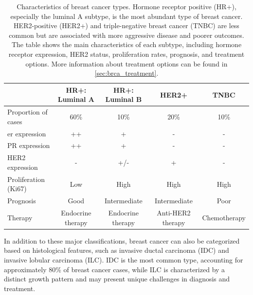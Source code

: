 \begin{table}[ht]
    \begin{tabular}{lcccc}
        \hline
                                        & HR+: Luminal A    & HR+: Luminal B
                                        &
        HER2+
                                        & TNBC
        \\ \hline
        Proportion of cases             & 60\%              & 10\%              &
        20\%
                                        & 10\%
        \\
        \gls{er}\textalpha{} expression & ++                & +
                                        & -
                                        & -
        \\
        PR expression                   & ++                & +                 & -
                                        & -
        \\
        HER2 expression                 & -                 & +/-               & +
                                        & -
        \\
        Proliferation (Ki67)            & Low               & High              &
        High
                                        & High
        \\
        Prognosis                       & Good              & Intermediate      &
        Intermediate
                                        & Poor
        \\
        Therapy                         & Endocrine therapy & Endocrine therapy &
        Anti-HER2
        therapy                         & Chemotherapy
        \\ \hline
    \end{tabular}
    \caption{Characteristics of breast cancer
        types\supercite{clusan_basic_2023}.
        Hormone receptor positive (HR+), especially the luminal A subtype, is the most
        abundant type of breast cancer.
        HER2-positive (HER2+) and triple-negative breast cancer (TNBC) are less common
        but are associated with more aggressive disease and poorer outcomes.
        The table shows the main characteristics of each subtype, including hormone
        receptor expression, HER2 status, proliferation rates, prognosis, and treatment
        options.
        More information about treatment options can be found in
        \cref{sec:brca_treatment}.
    }
    \label{tab:brca_subtypes}
\end{table}

In addition to these major classifications, breast cancer can also be
categorized based on histological features, such as invasive ductal carcinoma
(IDC) and invasive lobular carcinoma (ILC).
IDC is the most common type, accounting for approximately 80\% of breast cancer
cases, while ILC is characterized by a distinct growth pattern and may present
unique challenges in diagnosis and
treatment\supercite{mittal_molecular_nodate}.

